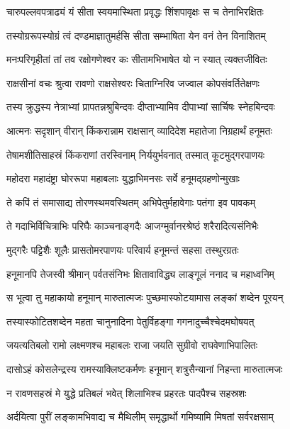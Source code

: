 \twolineshloka
{चारुपल्लवपत्राढ्यं यं सीता स्वयमास्थिता}
{प्रवृद्धः शिंशपावृक्षः स च तेनाभिरक्षितः} %

\twolineshloka
{तस्योग्ररूपस्योग्रं त्वं दण्डमाज्ञातुमर्हसि}
{सीता सम्भाषिता येन वनं तेन विनाशितम्} %

\twolineshloka
{मनःपरिगृहीतां तां तव रक्षोगणेश्वर}
{कः सीतामभिभाषेत यो न स्यात् त्यक्तजीवितः} %

\twolineshloka
{राक्षसीनां वचः श्रुत्वा रावणो राक्षसेश्वरः}
{चिताग्निरिव जज्वाल कोपसंवर्तितेक्षणः} %

\twolineshloka
{तस्य क्रुद्धस्य नेत्राभ्यां प्रापतन्नश्रुबिन्दवः}
{दीप्ताभ्यामिव दीपाभ्यां सार्चिषः स्नेहबिन्दवः} %

\twolineshloka
{आत्मनः सदृशान् वीरान् किंकरान्नाम राक्षसान्}
{व्यादिदेश महातेजा निग्रहार्थं हनूमतः} %

\twolineshloka
{तेषामशीतिसाहस्रं किंकराणां तरस्विनाम्}
{निर्ययुर्भवनात् तस्मात् कूटमुद्गरपाणयः} %

\twolineshloka
{महोदरा महादंष्ट्रा घोररूपा महाबलाः}
{युद्धाभिमनसः सर्वे हनूमद्ग्रहणोन्मुखाः} %

\twolineshloka
{ते कपिं तं समासाद्य तोरणस्थमवस्थितम्}
{अभिपेतुर्महावेगाः पतंगा इव पावकम्} %

\twolineshloka
{ते गदाभिर्विचित्राभिः परिघैः काञ्चनाङ्गदैः}
{आजग्मुर्वानरश्रेष्ठं शरैरादित्यसंनिभैः} %

\twolineshloka
{मुद्गरैः पट्टिशैः शूलैः प्रासतोमरपाणयः}
{परिवार्य हनूमन्तं सहसा तस्थुरग्रतः} %

\twolineshloka
{हनूमानपि तेजस्वी श्रीमान् पर्वतसंनिभः}
{क्षितावाविद्ध्य लाङ्गूलं ननाद च महाध्वनिम्} %

\twolineshloka
{स भूत्वा तु महाकायो हनूमान् मारुतात्मजः}
{पुच्छमास्फोटयामास लङ्कां शब्देन पूरयन्} %

\twolineshloka
{तस्यास्फोटितशब्देन महता चानुनादिना}
{पेतुर्विहङ्गा गगनादुच्चैश्चेदमघोषयत्} %

\twolineshloka
{जयत्यतिबलो रामो लक्ष्मणश्च महाबलः}
{राजा जयति सुग्रीवो राघवेणाभिपालितः} %

\twolineshloka
{दासोऽहं कोसलेन्द्रस्य रामस्याक्लिष्टकर्मणः}
{हनूमान् शत्रुसैन्यानां निहन्ता मारुतात्मजः} %

\twolineshloka
{न रावणसहस्रं मे युद्धे प्रतिबलं भवेत्}
{शिलाभिश्च प्रहरतः पादपैश्च सहस्रशः} %

\twolineshloka
{अर्दयित्वा पुरीं लङ्कामभिवाद्य च मैथिलीम्}
{समृद्धार्थो गमिष्यामि मिषतां सर्वरक्षसाम्} %


